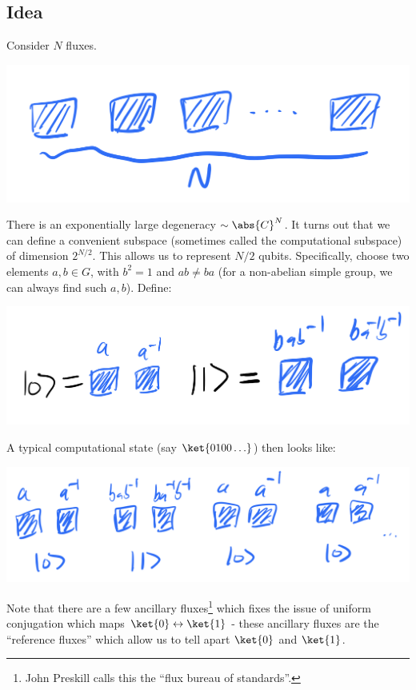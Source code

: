 \subsection{Idea}
Consider $N$ fluxes. 
\begin{center}
    \includegraphics[scale=0.35]{Lectures/Images/lec11-Nfluxes.png}
\end{center}

There is an exponentially large degeneracy $\sim \abs{C}^N$. It turns out that we can define a convenient subspace (sometimes called the computational subspace) of dimension $2^{N/2}$. This allows us to represent $N/2$ qubits. Specifically, choose two elements $a, b \in G$, with $b^2 = 1$ and $ab \neq ba$ (for a non-abelian simple group, we can always find such $a, b$). Define:
\begin{center}
    \includegraphics[scale=0.35]{Lectures/Images/lec11-compbasis.png}
\end{center}
A typical computational state (say $\ket{0100\ldots}$) then looks like:
\begin{center}
    \includegraphics[scale=0.35]{Lectures/Images/lec11-basisstateexample.png}
\end{center}

Note that there are a few ancillary fluxes\footnote{John Preskill calls this the ``flux bureau of standards''.} which fixes the issue of uniform conjugation which maps $\ket{0} \leftrightarrow \ket{1}$ - these ancillary fluxes are the ``reference fluxes'' which allow us to tell apart $\ket{0}$ and $\ket{1}$.

